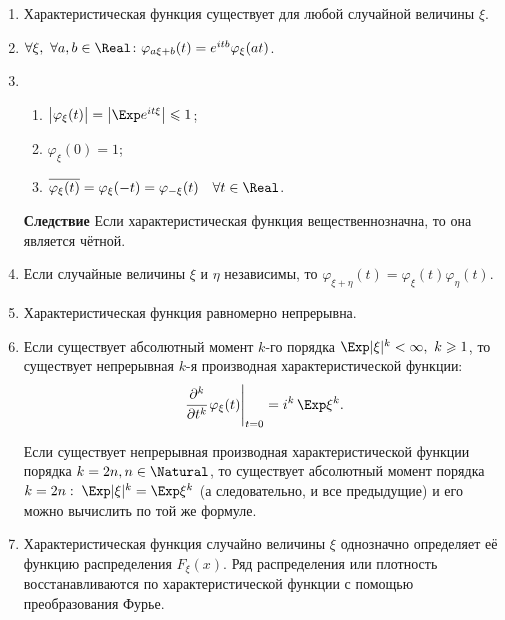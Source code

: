 \begin{namedthm}\leavevmode
    \begin{enumerate}
        \item 
            Характеристическая функция существует для любой случайной величины $\xi$.
        \item 
            $\forall \xi, ~\forall a, b \in \Real \colon \varphi_{a \xi + b}(t) = e^{itb} \varphi_{\xi}(at)$.
        \item 
            \begin{enumerate}
                \item $ \bigl| \varphi_{\xi}(t) \bigr| = \bigl| \Exp e^{i t \xi} \bigr| \leqslant 1 $;
                \item $ \varphi_{\xi}(0) = 1 $;
                \item $ \overline{\varphi_{\xi}(t)} = \varphi_{\xi}(-t) = \varphi_{-\xi}(t) \quad \forall t \in \Real$.
            \end{enumerate}
            \textbf{Следствие}
                Если характеристическая функция вещественнозначна, то она является чётной.
        \item 
            Если случайные величины $\xi$ и $\eta$ независимы, то $\varphi_{\xi + \eta}(t) = \varphi_{\xi}(t) \varphi_{\eta}(t)$.
        \item 
            Характеристическая функция равномерно непрерывна.
        \item 
            Если существует абсолютный момент $k$-го порядка $\Exp |\xi|^{k} < \infty,~ k \geqslant 1$, 
            то существует непрерывная $k$-я производная характеристической функции:
            \begin{equation*}
                \left.\cfrac{\partial^{k}}{\partial t^{k}} \, \varphi_{\xi}(t)\right|_{t=0}= i^{k} \, \Exp \xi^{k}.
            \end{equation*}
            
            Если существует непрерывная производная характеристической функции порядка $k = 2n, n \in \Natural$, 
            то существует абсолютный момент порядка $k = 2n: \; \Exp |\xi|^k = \Exp \xi^k$ (а следовательно, и все предыдущие) 
            и его можно вычислить по той же формуле.
        
        \item 
            Характеристическая функция случайно величины $\xi$ однозначно определяет её функцию распределения $F_{\xi}(x)$. 
            Ряд распределения или плотность восстанавливаются по характеристической функции с помощью преобразования Фурье.
            

\end{enumerate}
\end{namedthm}
